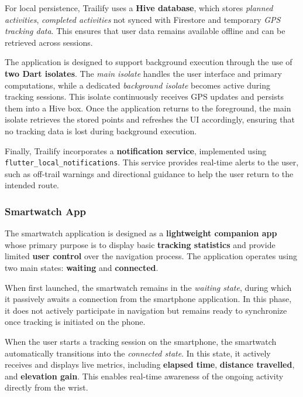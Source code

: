 \documentclass[12pt]{article}
\begin{document}
        For local persistence, Trailify uses a \textbf{Hive database}, which stores \textit{planned activities}, \textit{completed activities} not synced with Firestore and temporary \textit{GPS tracking data}. This ensures that user data remains available offline and can be retrieved across sessions.

        The application is designed to support background execution through the use of \textbf{two Dart isolates}. The \textit{main isolate} handles the user interface and primary computations, while a dedicated \textit{background isolate} becomes active during tracking sessions. This isolate continuously receives GPS updates and persists them into a Hive box. Once the application returns to the foreground, the main isolate retrieves the stored points and refreshes the UI accordingly, ensuring that no tracking data is lost during background execution.

        Finally, Trailify incorporates a \textbf{notification service}, implemented using \\ \texttt{flutter\_local\_notifications}. This service provides real-time alerts to the user, such as off-trail warnings and directional guidance to help the user return to the intended route.
    
    \subsubsection{Smartwatch App}
        The smartwatch application is designed as a \textbf{lightweight companion app} whose primary purpose is to display basic \textbf{tracking statistics} and provide limited \textbf{user control} over the navigation process. The application operates using two main states: \textbf{waiting} and \textbf{connected}.

        When first launched, the smartwatch remains in the \textit{waiting state}, during which it passively awaits a connection from the smartphone application. In this phase, it does not actively participate in navigation but remains ready to synchronize once tracking is initiated on the phone.

        When the user starts a tracking session on the smartphone, the smartwatch automatically transitions into the \textit{connected state}. In this state, it actively receives and displays live metrics, including \textbf{elapsed time}, \textbf{distance travelled}, and \textbf{elevation gain}. This enables real-time awareness of the ongoing activity directly from the wrist.
\end{document}
